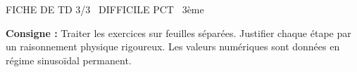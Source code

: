 \documentclass[11pt]{article}
\begin{document}
\begin{tcolorbox}[enhanced,colback=popink,colframe=popink,arc=10pt,boxrule=0pt,left=12pt,right=12pt,top=9pt,bottom=9pt]
{\color{white}\popxbold\small FICHE DE TD 3/3 \textbullet\ DIFFICILE \hfill PCT \textbullet\ 3ème\par}
\end{tcolorbox}
\vspace{4pt}
\noindent \textbf{Consigne :} Traiter les exercices sur feuilles séparées. Justifier chaque étape par un raisonnement physique rigoureux. Les valeurs numériques sont données en régime sinusoïdal permanent.
\end{document}
